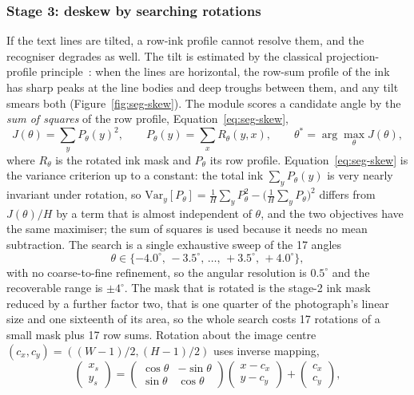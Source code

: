 \subsubsection{Stage 3: deskew by searching rotations}

If the text lines are tilted, a row-ink profile cannot resolve them, and the recogniser degrades as well.
The tilt is estimated by the classical projection-profile principle~\cite{postl1986}: when the lines are horizontal, the row-sum profile of the ink has sharp peaks at the line bodies and deep troughs between them, and any tilt smears both (Figure~\ref{fig:seg-skew}).
The module scores a candidate angle by the \emph{sum of squares} of the row profile, Equation~\ref{eq:seg-skew},
\begin{equation}
J(\theta)=\sum_y P_\theta(y)^2,\qquad P_\theta(y)=\sum_x R_\theta(y,x),\qquad \theta^*=\arg\max_\theta J(\theta),
\label{eq:seg-skew}
\end{equation}
where $R_\theta$ is the rotated ink mask and $P_\theta$ its row profile.
Equation~\ref{eq:seg-skew} is the variance criterion up to a constant: the total ink $\sum_y P_\theta(y)$ is very nearly invariant under rotation, so $\mathrm{Var}_y[P_\theta]=\frac1H\sum_yP_\theta^2-\bigl(\frac1H\sum_yP_\theta\bigr)^2$ differs from $J(\theta)/H$ by a term that is almost independent of $\theta$, and the two objectives have the same maximiser; the sum of squares is used because it needs no mean subtraction.
The search is a single exhaustive sweep of the 17 angles
\begin{equation*}
\theta\in\{-4.0^\circ,\,-3.5^\circ,\,\ldots,\,+3.5^\circ,\,+4.0^\circ\},
\end{equation*}
with no coarse-to-fine refinement, so the angular resolution is $0.5^\circ$ and the recoverable range is $\pm4^\circ$.
The mask that is rotated is the stage-2 ink mask reduced by a further factor two, that is one quarter of the photograph's linear size and one sixteenth of its area, so the whole search costs 17 rotations of a small mask plus 17 row sums.
Rotation about the image centre $(c_x,c_y)=((W-1)/2,(H-1)/2)$ uses inverse mapping,
\begin{equation}
\begin{pmatrix}x_s\\y_s\end{pmatrix}=\begin{pmatrix}\cos\theta&-\sin\theta\\ \sin\theta&\cos\theta\end{pmatrix}\begin{pmatrix}x-c_x\\y-c_y\end{pmatrix}+\begin{pmatrix}c_x\\c_y\end{pmatrix},
\label{eq:seg-rot}
\end{equation}
